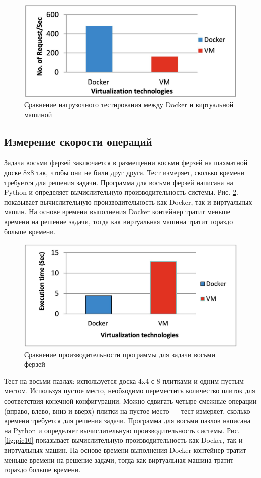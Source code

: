 \documentclass{mirea}
\begin{document}
	\begin{figure}[H]
		\centering
		\includegraphics[width=.6\textwidth]{img8}
		\parskip=6pt
		\caption{Сравнение нагрузочного тестирования между Docker и виртуальной машиной}
		\label{fig:pic8}
	\end{figure}

	\subsection{Измерение скорости операций}
	
	Задача восьми ферзей заключается в размещении восьми ферзей на шахматной доске 8x8 так, чтобы они не били друг друга. Тест измеряет, сколько времени требуется для решения задачи. Программа для восьми ферзей написана на Python и определяет вычислительную производительность системы. Рис. \ref{fig:pic9}. показывает вычислительную производительность как Docker, так и виртуальных машин. На основе времени выполнения Docker контейнер тратит меньше времени на решение задачи, тогда как виртуальная машина тратит гораздо больше времени.
	
	\begin{figure}[H]
		\centering
		\includegraphics[width=.6\textwidth]{img9}
		\parskip=6pt
		\caption{Сравнение производительности программы для задачи восьми ферзей}
		\label{fig:pic9}
	\end{figure}

	Тест на восьми пазлах: используется доска 4x4 с 8 плитками и одним пустым местом. Используя пустое место, необходимо переместить количество плиток для соответствия конечной конфигурации. Можно сдвигать четыре смежные операции (вправо, влево, вниз и вверх) плитки на пустое место — тест измеряет, сколько времени требуется для решения задачи. Программа для восьми пазлов написана на Python и определяет вычислительную производительность системы. Рис. \ref{fig:pic10} показывает вычислительную производительность как Docker, так и виртуальных машин. На основе времени выполнения Docker контейнер тратит меньше времени на решение задачи, тогда как виртуальная машина тратит гораздо больше времени.
	
\end{document}
